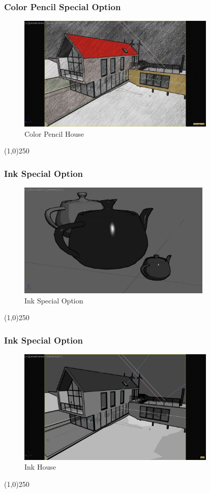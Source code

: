 \begin{frame}
\frametitle{Color Pencil Special Option}
\begin{figure}
	\centering
	\includegraphics[height=5.5cm]{img/ViewportOptions/ColorPencilHouse.jpg}
	\caption{Color Pencil House}
	\label{fig:ColorPencilHouse}
\end{figure}
\end{frame}
\begin{center}\line(1,0){250}\end{center}





\begin{frame}
\frametitle{Ink Special Option}
\begin{figure}
	\centering
	\includegraphics[height=5.5cm]{img/ViewportOptions/Ink.jpg}
	\caption{Ink Special Option}
	\label{fig:InkSpecialOption}
\end{figure}
\end{frame}
\begin{center}\line(1,0){250}\end{center}


\begin{frame}
\frametitle{Ink Special Option}
\begin{figure}
	\centering
	\includegraphics[height=5.5cm]{img/ViewportOptions/InkHouse.jpg}
	\caption{Ink House}
	\label{fig:InkHouse}
\end{figure}
\end{frame}
\begin{center}\line(1,0){250}\end{center}


